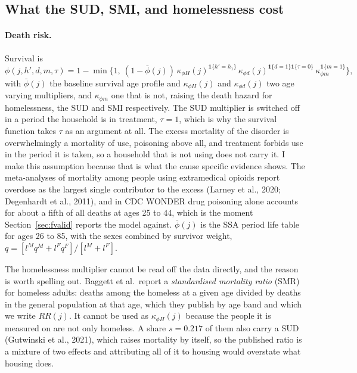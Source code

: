 \documentclass[10pt]{article}
\begin{document}
\subsection{What the SUD, SMI, and homelessness cost}\label{sec:fcosts}

\paragraph{Death risk.}\label{sec:fdeath} Survival is
\begin{equation}\label{eq:fsurv}
\phi(j,h',d,m,\tau)=1-\min\Big\{1,\ (1-\bar\phi(j))\,
\kappa_{\phi H}(j)^{\mathbf{1}\{h'=h_1\}}\,
\kappa_{\phi d}(j)^{\mathbf{1}\{d=1\}\mathbf{1}\{\tau=0\}}\,
\kappa_{\phi m}^{\mathbf{1}\{m=1\}}\Big\},
\end{equation}
with $\bar\phi(j)$ the baseline survival age profile and
$\kappa_{\phi H}(j)$ and $\kappa_{\phi d}(j)$ two age varying multipliers,
and $\kappa_{\phi m}$ one that is not,
raising the death hazard for homelessness, the SUD and SMI
respectively. The SUD multiplier is switched off in a period the
household is in treatment, $\tau=1$, which is why the survival function takes $\tau$
as an argument at all. The excess mortality of the disorder is
overwhelmingly a mortality of use, poisoning above all, and treatment forbids use
in the period it is taken, so a household that is not using does not carry it.
I make this assumption because that is what the cause specific evidence
shows. The meta-analyses of mortality among people using extramedical opioids report
overdose as the largest single contributor to the excess (Larney et al., 2020;
Degenhardt et al., 2011), and in CDC WONDER drug poisoning alone accounts for about
a fifth of all deaths at ages 25 to 44, which is the moment
Section~\ref{sec:fvalid} reports the model against.
$\bar\phi(j)$ is the SSA period life table for ages 26 to 85, with the sexes
combined by survivor weight, $q=[l^Mq^M+l^Fq^F]/[l^M+l^F]$.

The homelessness multiplier cannot be read off the data directly, and
the reason is worth spelling out. Baggett et al.\ report a \emph{standardised
mortality ratio} (SMR) for homeless adults: deaths among the homeless at a given
age divided by deaths in the general population at that age, which they publish
by age band and which we write $RR(j)$. It cannot be used as $\kappa_{\phi H}(j)$
because the people it is measured on are not only homeless. A share $s=0.217$ of
them also carry a SUD (Gutwinski et al., 2021), which raises mortality by
itself, so the published ratio
is a mixture of two effects and attributing all of it to housing would overstate
what housing does.
\end{document}
